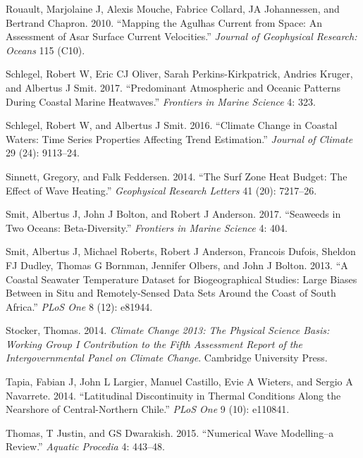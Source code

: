 \documentclass[12pt,a4paper,]{article}
\begin{document}
\leavevmode\hypertarget{ref-Rouault2010}{}%
Rouault, Marjolaine J, Alexis Mouche, Fabrice Collard, JA Johannessen,
and Bertrand Chapron. 2010. ``Mapping the Agulhas Current from Space: An
Assessment of Asar Surface Current Velocities.'' \emph{Journal of
Geophysical Research: Oceans} 115 (C10).

\leavevmode\hypertarget{ref-Schlegel2017}{}%
Schlegel, Robert W, Eric CJ Oliver, Sarah Perkins-Kirkpatrick, Andries
Kruger, and Albertus J Smit. 2017. ``Predominant Atmospheric and Oceanic
Patterns During Coastal Marine Heatwaves.'' \emph{Frontiers in Marine
Science} 4: 323.

\leavevmode\hypertarget{ref-Schlegel2016}{}%
Schlegel, Robert W, and Albertus J Smit. 2016. ``Climate Change in
Coastal Waters: Time Series Properties Affecting Trend Estimation.''
\emph{Journal of Climate} 29 (24): 9113--24.

\leavevmode\hypertarget{ref-Sinnett2014}{}%
Sinnett, Gregory, and Falk Feddersen. 2014. ``The Surf Zone Heat Budget:
The Effect of Wave Heating.'' \emph{Geophysical Research Letters} 41
(20): 7217--26.

\leavevmode\hypertarget{ref-Smit2017}{}%
Smit, Albertus J, John J Bolton, and Robert J Anderson. 2017. ``Seaweeds
in Two Oceans: Beta-Diversity.'' \emph{Frontiers in Marine Science} 4:
404.

\leavevmode\hypertarget{ref-Smit2013}{}%
Smit, Albertus J, Michael Roberts, Robert J Anderson, Francois Dufois,
Sheldon FJ Dudley, Thomas G Bornman, Jennifer Olbers, and John J Bolton.
2013. ``A Coastal Seawater Temperature Dataset for Biogeographical
Studies: Large Biases Between in Situ and Remotely-Sensed Data Sets
Around the Coast of South Africa.'' \emph{PLoS One} 8 (12): e81944.

\leavevmode\hypertarget{ref-Stocker2014}{}%
Stocker, Thomas. 2014. \emph{Climate Change 2013: The Physical Science
Basis: Working Group I Contribution to the Fifth Assessment Report of
the Intergovernmental Panel on Climate Change}. Cambridge University
Press.

\leavevmode\hypertarget{ref-Tapia2014}{}%
Tapia, Fabian J, John L Largier, Manuel Castillo, Evie A Wieters, and
Sergio A Navarrete. 2014. ``Latitudinal Discontinuity in Thermal
Conditions Along the Nearshore of Central-Northern Chile.'' \emph{PLoS
One} 9 (10): e110841.

\leavevmode\hypertarget{ref-Thomas2015}{}%
Thomas, T Justin, and GS Dwarakish. 2015. ``Numerical Wave Modelling--a
Review.'' \emph{Aquatic Procedia} 4: 443--48.
\end{document}
